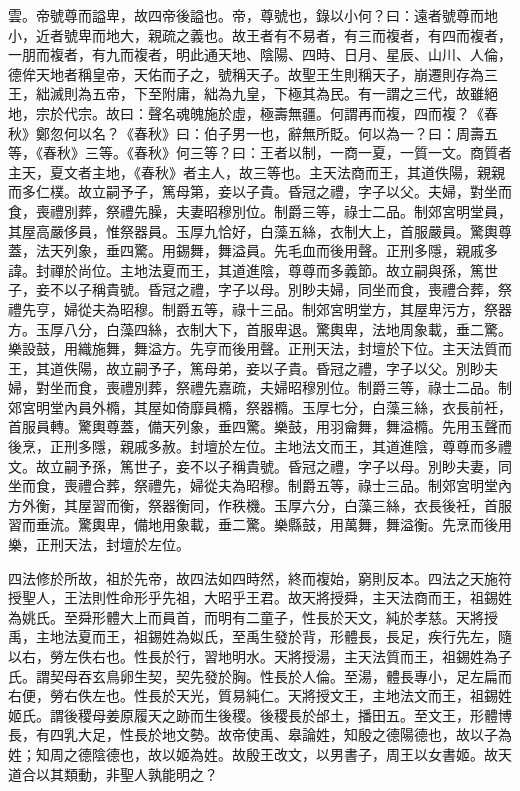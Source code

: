 雲。帝號尊而謚卑，故四帝後謚也。帝，尊號也，錄以小何？曰：遠者號尊而地小，近者號卑而地大，親疏之義也。故王者有不易者，有三而複者，有四而複者，一朋而複者，有九而複者，明此通天地、陰陽、四時、日月、星辰、山川、人倫，德侔天地者稱皇帝，天佑而子之，號稱天子。故聖王生則稱天子，崩遷則存為三王，絀滅則為五帝，下至附庸，絀為九皇，下極其為民。有一謂之三代，故雖絕地，宗於代宗。故曰：聲名魂魄施於虛，極壽無疆。何謂再而複，四而複？《春秋》鄭忽何以名？《春秋》曰：伯子男一也，辭無所貶。何以為一？曰：周壽五等，《春秋》三等。《春秋》何三等？曰：王者以制，一商一夏，一質一文。商質者主天，夏文者主地，《春秋》者主人，故三等也。主天法商而王，其道佚陽，親親而多仁樸。故立嗣予子，篤母第，妾以子貴。昏冠之禮，字子以父。夫婦，對坐而食，喪禮別葬，祭禮先臊，夫妻昭穆別位。制爵三等，祿士二品。制郊宮明堂員，其屋高嚴侈員，惟祭器員。玉厚九恰好，白藻五絲，衣制大上，首服嚴員。驚輿尊蓋，法天列象，垂四驚。用錫舞，舞溢員。先毛血而後用聲。正刑多隱，親戚多諱。封禪於尚位。主地法夏而王，其道進陰，尊尊而多義節。故立嗣與孫，篤世子，妾不以子稱貴號。昏冠之禮，字子以母。別眇夫婦，同坐而食，喪禮合葬，祭禮先亨，婦從夫為昭穆。制爵五等，祿十三品。制郊宮明堂方，其屋卑污方，祭器方。玉厚八分，白藻四絲，衣制大下，首服卑退。驚輿卑，法地周象載，垂二驚。樂設鼓，用織施舞，舞溢方。先亨而後用聲。正刑天法，封壇於下位。主天法質而王，其道佚陽，故立嗣予子，篤母弟，妾以子貴。昏冠之禮，字子以父。別眇夫婦，對坐而食，喪禮別葬，祭禮先嘉疏，夫婦昭穆別位。制爵三等，祿士二品。制郊宮明堂內員外橢，其屋如倚靡員橢，祭器橢。玉厚七分，白藻三絲，衣長前衽，首服員轉。驚輿尊蓋，備天列象，垂四驚。樂鼓，用羽龠舞，舞溢橢。先用玉聲而後烹，正刑多隱，親戚多赦。封壇於左位。主地法文而王，其道進陰，尊尊而多禮文。故立嗣予孫，篤世子，妾不以子稱貴號。昏冠之禮，字子以母。別眇夫妻，同坐而食，喪禮合葬，祭禮先，婦從夫為昭穆。制爵五等，祿士三品。制郊宮明堂內方外衡，其屋習而衡，祭器衡同，作秩機。玉厚六分，白藻三絲，衣長後衽，首服習而垂流。驚輿卑，備地用象載，垂二驚。樂縣鼓，用萬舞，舞溢衡。先烹而後用樂，正刑天法，封壇於左位。

四法修於所故，祖於先帝，故四法如四時然，終而複始，窮則反本。四法之天施符授聖人，王法則性命形乎先祖，大昭乎王君。故天將授舜，主天法商而王，祖錫姓為姚氏。至舜形體大上而員首，而明有二童子，性長於天文，純於孝慈。天將授禹，主地法夏而王，祖錫姓為姒氏，至禹生發於背，形體長，長足，疾行先左，隨以右，勞左佚右也。性長於行，習地明水。天將授湯，主天法質而王，祖錫姓為子氏。謂契母吞玄鳥卵生契，契先發於胸。性長於人倫。至湯，體長專小，足左扁而右便，勞右佚左也。性長於天光，質易純仁。天將授文王，主地法文而王，祖錫姓姬氏。謂後稷母姜原履天之跡而生後稷。後稷長於邰土，播田五。至文王，形體博長，有四乳大足，性長於地文勢。故帝使禹、皋論姓，知殷之德陽德也，故以子為姓；知周之德陰德也，故以姬為姓。故殷王改文，以男書子，周王以女書姬。故天道合以其類動，非聖人孰能明之？

